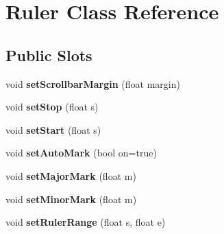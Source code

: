 \hypertarget{class_ruler}{
\section{\-Ruler \-Class \-Reference}
\label{class_ruler}
}
\subsection*{\-Public \-Slots}
\begin{DoxyCompactItemize}
\item 
\hypertarget{class_ruler_ad7b724cf581c5bc17046227a0dd264d6}{
void {\bfseries set\-Scrollbar\-Margin} (float margin)}
\label{class_ruler_ad7b724cf581c5bc17046227a0dd264d6}

\item 
\hypertarget{class_ruler_a2a346327458124ecc806f9ac86367167}{
void {\bfseries set\-Stop} (float s)}
\label{class_ruler_a2a346327458124ecc806f9ac86367167}

\item 
\hypertarget{class_ruler_a95b87065c900e58f908674dd68d8e9d6}{
void {\bfseries set\-Start} (float s)}
\label{class_ruler_a95b87065c900e58f908674dd68d8e9d6}

\item 
\hypertarget{class_ruler_ad10cb83bfe3a505f0d67b689a80b0603}{
void {\bfseries set\-Auto\-Mark} (bool on=true)}
\label{class_ruler_ad10cb83bfe3a505f0d67b689a80b0603}

\item 
\hypertarget{class_ruler_ac6c637e872e43067c70251514e4c9297}{
void {\bfseries set\-Major\-Mark} (float m)}
\label{class_ruler_ac6c637e872e43067c70251514e4c9297}

\item 
\hypertarget{class_ruler_a4aa70b7508614d8ace485fe4ea1107d6}{
void {\bfseries set\-Minor\-Mark} (float m)}
\label{class_ruler_a4aa70b7508614d8ace485fe4ea1107d6}

\item 
\hypertarget{class_ruler_ae8a8fb507767c213825daf6b282e7746}{
void {\bfseries set\-Ruler\-Range} (float s, float e)}
\label{class_ruler_ae8a8fb507767c213825daf6b282e7746}

\end{DoxyCompactItemize}
